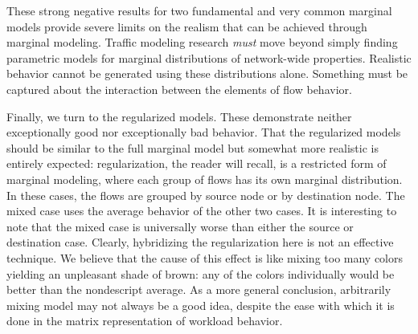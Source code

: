 \documentclass[twocolumn,final]{svjour3}
\newcommand{\caps}[1]{{\smaller{#1}}}
\newcommand{\Section}[1]{\hyperref[sec:#1]{Section~\ref*{sec:#1}}}
\newcommand{\model}[1]{\textsf{#1}}
\newcommand{\E}[1]{\left<#1\right>}
\begin{document}
These strong negative results for two fundamental and very common marginal models provide severe limits on the realism that can be achieved through marginal modeling. Traffic modeling research \textit{must} move beyond simply finding parametric models for marginal distributions of network-wide properties. Realistic behavior cannot be generated using these distributions alone. Something must be captured about the interaction between the elements of flow behavior.

Finally, we turn to the regularized models. These demonstrate neither exceptionally good nor exceptionally bad behavior. That the regularized models should be similar to the \model{full marginal} model but somewhat more realistic is entirely expected: regularization, the reader will recall, is a restricted form of marginal modeling, where each group of flows has its own marginal distribution. In these cases, the flows are grouped by source node or by destination node. The mixed case uses the average behavior of the other two cases. It is interesting to note that the mixed case is universally worse than either the source or destination case. Clearly, hybridizing the regularization here is not an effective technique. We believe that the cause of this effect is like mixing too many colors yielding an unpleasant shade of brown: any of the colors individually would be better than the nondescript average. As a more general conclusion, arbitrarily mixing model may not always be a good idea, despite the ease with which it is done in the matrix representation of workload behavior.

\end{document}
